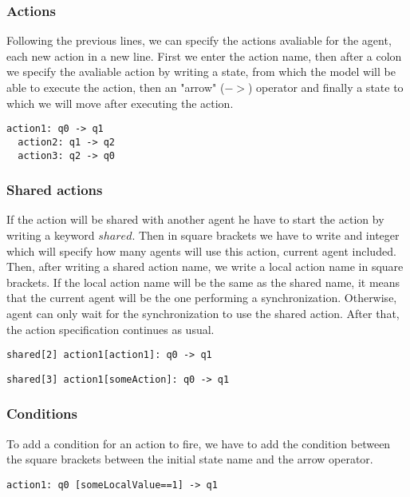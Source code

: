 \documentclass[12pt]{article}
\begin{document}
\subsubsection{Actions}
Following the previous lines, we can specify the actions avaliable for the agent, each new action in a new line.
First we enter the action name, then after a colon we specify the avaliable action by writing a state, from which the model will be able to execute the action, then an "arrow" ($->$) operator and finally a state to which we will move after executing the action.
\begin{lstlisting}[title={Making a loop out of 3 actions: action1, action2 and action3.}]
  action1: q0 -> q1
  action2: q1 -> q2
  action3: q2 -> q0
\end{lstlisting}

\subsubsection{Shared actions}
If the action will be shared with another agent he have to start the action by writing a keyword $shared$. Then in square brackets we have to write and integer which will specify how many agents will use this action, current agent included. Then, after writing a shared action name, we write a local action name in square brackets. If the local action name will be the same as the shared name, it means that the current agent will be the one performing a synchronization. Otherwise, agent can only wait for the synchronization to use the shared action. After that, the action specification continues as usual.
\begin{lstlisting}[title={Creating an action that will synchronize with 1 other agent. The current agent will be the one performing the sync.}]
  shared[2] action1[action1]: q0 -> q1
\end{lstlisting}
\begin{lstlisting}[title={Creating an action that will synchronize with 2 other agent. The current agent will be the one waiting for sync.}]
  shared[3] action1[someAction]: q0 -> q1
\end{lstlisting}

\subsubsection{Conditions}
To add a condition for an action to fire, we have to add the condition between the square brackets between the initial state name and the arrow operator.
\begin{lstlisting}[title={Local action that can only fire if someLocalValue is equal to 1.}]
  action1: q0 [someLocalValue==1] -> q1
\end{lstlisting}
\end{document}
